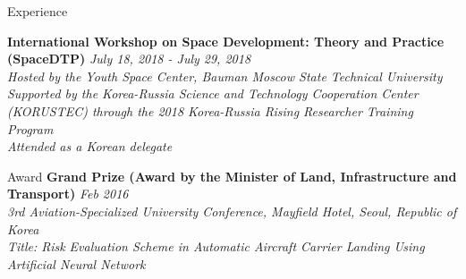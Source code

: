 \documentclass{resume}
\begin{document}
%
%
%
%
% 
%
%
%

\begin{rSection}{Experience}

{\bf International Workshop on Space Development: Theory and Practice (SpaceDTP)} \hfill {\em July 18, 2018 - July 29, 2018} 
\\{\textit{ Hosted by the Youth Space Center, Bauman Moscow State Technical University}}
\\{\textit{ Supported by the Korea-Russia Science and Technology Cooperation Center (KORUSTEC) through the 2018 Korea-Russia Rising Researcher Training Program}}
\\{\textit{ Attended as a Korean delegate}}

\end{rSection}


%
%
%
%
%
%
\begin{rSection}{Award}
{\bf Grand Prize (Award by the Minister of Land, Infrastructure and Transport)} \hfill {\em Feb 2016} \\ 
\textit{3rd Aviation-Specialized University Conference, Mayfield Hotel, Seoul, Republic of Korea} \\
\textit{Title: Risk Evaluation Scheme in Automatic Aircraft Carrier Landing Using Artificial Neural Network}

\end{rSection}
\end{document}
